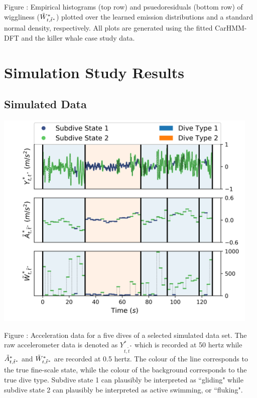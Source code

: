\documentclass{article}
\begin{document}
        \noindent Figure : Empirical histograms (top row) and psuedoresiduals (bottom row) of wiggliness ($\tilde{W}^*_{t,\tilde t^*}$) plotted over the learned emission distributions and a standard normal density, respectively. All plots are generated using the fitted CarHMM-DFT and the killer whale case study data.
        \addtocounter{fignum}{1}


\newpage
\section{Simulation Study Results}

    \subsection{Simulated Data}
    
        \begin{center}
    	\includegraphics[width=5in]{../Plots/sim_data.png}
    	\end{center}
    	
    	\noindent Figure : Acceleration data for a five dives of a selected simulated data set. The raw accelerometer data is denoted as $Y^*_{t,\tilde t^*}$ which is recorded at 50 hertz while $\tilde{A}^*_{t,\tilde t^*}$ and $\tilde{W}^*_{t,\tilde t^*}$ are recorded at 0.5 hertz. The colour of the line corresponds to the true fine-scale state, while the colour of the background corresponds to the true dive type. Subdive state 1 can plausibly be interpreted as ``gliding" while subdive state 2 can plausibly be interpreted as active swimming, or ``fluking".
    	\addtocounter{fignum}{1}
\end{document}
